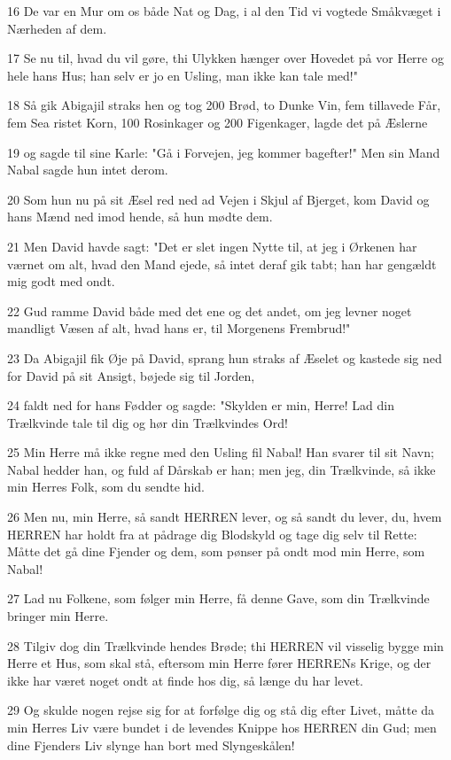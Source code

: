 \par 16 De var en Mur om os både Nat og Dag, i al den Tid vi vogtede Småkvæget i Nærheden af dem.
\par 17 Se nu til, hvad du vil gøre, thi Ulykken hænger over Hovedet på vor Herre og hele hans Hus; han selv er jo en Usling, man ikke kan tale med!"
\par 18 Så gik Abigajil straks hen og tog 200 Brød, to Dunke Vin, fem tillavede Får, fem Sea ristet Korn, 100 Rosinkager og 200 Figenkager, lagde det på Æslerne
\par 19 og sagde til sine Karle: "Gå i Forvejen, jeg kommer bagefter!" Men sin Mand Nabal sagde hun intet derom.
\par 20 Som hun nu på sit Æsel red ned ad Vejen i Skjul af Bjerget, kom David og hans Mænd ned imod hende, så hun mødte dem.
\par 21 Men David havde sagt: "Det er slet ingen Nytte til, at jeg i Ørkenen har værnet om alt, hvad den Mand ejede, så intet deraf gik tabt; han har gengældt mig godt med ondt.
\par 22 Gud ramme David både med det ene og det andet, om jeg levner noget mandligt Væsen af alt, hvad hans er, til Morgenens Frembrud!"
\par 23 Da Abigajil fik Øje på David, sprang hun straks af Æselet og kastede sig ned for David på sit Ansigt, bøjede sig til Jorden,
\par 24 faldt ned for hans Fødder og sagde: "Skylden er min, Herre! Lad din Trælkvinde tale til dig og hør din Trælkvindes Ord!
\par 25 Min Herre må ikke regne med den Usling fil Nabal! Han svarer til sit Navn; Nabal hedder han, og fuld af Dårskab er han; men jeg, din Trælkvinde, så ikke min Herres Folk, som du sendte hid.
\par 26 Men nu, min Herre, så sandt HERREN lever, og så sandt du lever, du, hvem HERREN har holdt fra at pådrage dig Blodskyld og tage dig selv til Rette: Måtte det gå dine Fjender og dem, som pønser på ondt mod min Herre, som Nabal!
\par 27 Lad nu Folkene, som følger min Herre, få denne Gave, som din Trælkvinde bringer min Herre.
\par 28 Tilgiv dog din Trælkvinde hendes Brøde; thi HERREN vil visselig bygge min Herre et Hus, som skal stå, eftersom min Herre fører HERRENs Krige, og der ikke har været noget ondt at finde hos dig, så længe du har levet.
\par 29 Og skulde nogen rejse sig for at forfølge dig og stå dig efter Livet, måtte da min Herres Liv være bundet i de levendes Knippe hos HERREN din Gud; men dine Fjenders Liv slynge han bort med Slyngeskålen!
